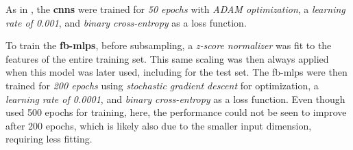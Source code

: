 As in \textcite{eberlein_convolutional_2018}, the \textbf{\glspl{cnn}} were trained for \textit{50 epochs} with \textit{ADAM optimization}, a \textit{learning rate of \num{0.001}}, and \textit{binary cross-entropy} as a loss function.

To train the \textbf{\glspl{fb-mlp}}, before subsampling, a \textit{z-score normalizer} was fit to the features of the entire training set.
This same scaling was then always applied when this model was later used, including for the test set.
The \glspl{fb-mlp} were then trained for \textit{200 epochs} using \textit{stochastic gradient descent} for optimization, a \textit{learning rate of \num{0.0001}}, and \textit{binary cross-entropy} as a loss function.
Even though \textcite{muller_coherent_2022} used 500 epochs for training, here, the performance could not be seen to improve after 200 epochs, which is likely also due to the smaller input dimension, requiring less fitting.

